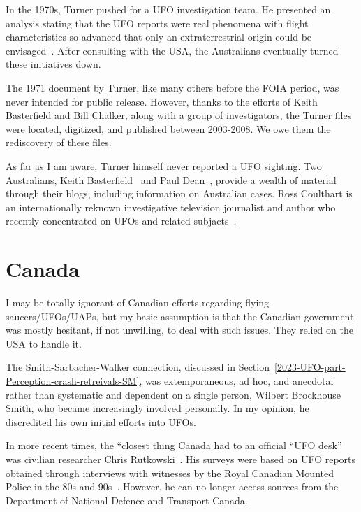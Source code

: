 In the 1970s, Turner pushed for a UFO investigation team. He presented an analysis stating that the UFO reports were real phenomena with flight characteristics so advanced that only an extraterrestrial origin could be envisaged~\cite{TurnerAustralia1971}. After consulting with the USA, the Australians eventually turned these initiatives down.


The 1971 document by Turner, like many others before the FOIA period, was never intended for public release.
However, thanks to the efforts of Keith Basterfield and Bill Chalker, along with a group of investigators, the Turner files were located,
digitized, and published between 2003-2008. We owe them the rediscovery of these files.

As far as I am aware, Turner himself never reported a UFO sighting. Two Australians,
Keith Basterfield~\cite{Basterfield-Blog} and Paul Dean~\cite{PaulDean-blog},
provide a wealth of material through their blogs, including information on Australian cases.
Ross Coulthart is an internationally reknown investigative television journalist and author
who recently concentrated on UFOs and related subjacts~\cite{Coulthart2021Aug}.


\section{Canada}
\label{2023-UFO-part-Perception-types-Canada}

I may be totally ignorant of Canadian efforts regarding flying saucers/UFOs/UAPs, but my basic assumption is that the Canadian government was mostly hesitant, if not unwilling, to deal with such issues. They relied on the USA to handle it.

The Smith-Sarbacher-Walker connection, discussed in Section~\ref{2023-UFO-part-Perception-crash-retreivals-SM}, was extemporaneous, ad hoc, and anecdotal rather than systematic and dependent on a single person, Wilbert Brockhouse Smith, who became increasingly involved personally. In my opinion, he discredited his own initial efforts into UFOs.

In more recent times, the ``closest thing Canada had to an official ``UFO desk''~\cite{Otis2022Mar} was civilian researcher Chris Rutkowski~\cite{Rutkowski2022May}. His surveys were based on UFO reports obtained through interviews with witnesses by the Royal Canadian Mounted Police in the 80s and 90s~\cite{Rutkowsky2022Aug}. However, he can no longer access sources from the Department of National Defence and Transport Canada.

